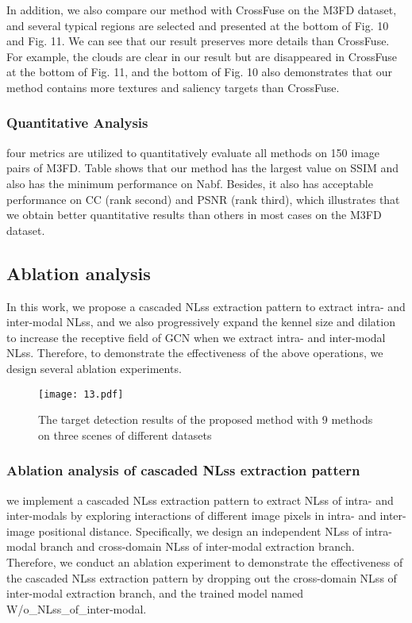 \documentclass[journal]{IEEEtran}
\begin{document}
In addition, we also compare our method with CrossFuse on the M3FD dataset, and several typical regions are selected and presented at the bottom of Fig. 10 and Fig. 11. We can see that our result preserves more details than CrossFuse. For example, the clouds are clear in our result but are disappeared in CrossFuse at the bottom of Fig. 11, and the bottom of Fig. 10 also demonstrates that our method contains more textures and saliency targets than CrossFuse.


\subsubsection{Quantitative Analysis}
four metrics are utilized to quantitatively evaluate all methods on 150 image pairs of M3FD. Table \uppercase\expandafter{} shows that our method has the largest value on SSIM and also has the minimum performance on Nabf. Besides, it also has acceptable performance on CC (rank second) and PSNR (rank third), which illustrates that we obtain better quantitative results than others in most cases on the M3FD dataset.

\subsection{Ablation analysis}
In this work, we propose a cascaded NLss extraction pattern to extract intra- and inter-modal NLss, and we also progressively expand the kennel size and dilation to increase the receptive field of GCN when we extract intra- and inter-modal NLss. Therefore, to demonstrate the effectiveness of the above operations, we design several ablation experiments.

\begin{figure*}[!h]
\centering
\texttt{[image: 13.pdf]}
\caption{The target detection results of the proposed method with 9 methods on three scenes of different datasets}
\label{FIG:13}
\end{figure*}

\subsubsection{Ablation analysis of cascaded NLss extraction pattern}
we implement a cascaded NLss extraction pattern to extract NLss of intra- and inter-modals by exploring interactions of different image pixels in intra- and inter-image positional distance. Specifically, we design an independent NLss of intra-modal branch and cross-domain NLss of inter-modal extraction branch. Therefore, we conduct an ablation experiment to demonstrate the effectiveness of the cascaded NLss extraction pattern by dropping out the cross-domain NLss of inter-modal extraction branch, and the trained model named W/o\_NLss\_of\_inter-modal.
\end{document}
